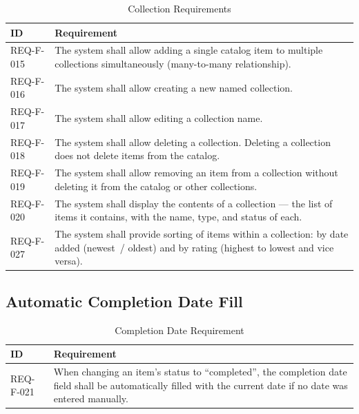 \begin{table}[h]
\caption{Collection Requirements}
\label{tab:dobirkы}
\begin{tabular}{L{2.5cm} L{11.5cm}}
\toprule
\textbf{ID} & \textbf{Requirement} \\
\midrule
REQ-F-015 & The system shall allow adding a single catalog item to multiple collections simultaneously (many-to-many relationship).  \\
\addlinespace
REQ-F-016 & The system shall allow creating a new named collection.  \\
\addlinespace
REQ-F-017 & The system shall allow editing a collection name.  \\
\addlinespace
REQ-F-018 & The system shall allow deleting a collection. Deleting a collection does not delete items from the catalog.  \\
\addlinespace
REQ-F-019 & The system shall allow removing an item from a collection without deleting it from the catalog or other collections.  \\
\addlinespace
REQ-F-020 & The system shall display the contents of a collection --- the list of items it contains, with the name, type, and status of each.  \\
\addlinespace
REQ-F-027 & The system shall provide sorting of items within a collection: by date added (newest~/ oldest) and by rating (highest to lowest and vice versa).  \\
\bottomrule
\end{tabular}
\end{table}

\subsection{Automatic Completion Date Fill}

\begin{table}[h]
\caption{Completion Date Requirement}
\label{tab:data}
\begin{tabular}{L{2.5cm} L{11.5cm}}
\toprule
\textbf{ID} & \textbf{Requirement} \\
\midrule
REQ-F-021 & When changing an item's status to ``completed'', the completion date field shall be automatically filled with the current date if no date was entered manually.  \\
\bottomrule
\end{tabular}
\end{table}


